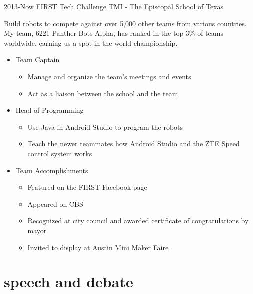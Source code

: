 \documentclass[]{friggeri-cv} %
\begin{document}
\begin{entrylist}
\entry
{2013-Now}
{FIRST Tech Challenge}
{TMI - The Episcopal School of Texas}
{Build robots to compete against over 5,000 other teams from various countries. My team, 6221 Panther Bots Alpha, has ranked in the top 3\% of teams worldwide, earning us a spot in the world championship. 
\begin{itemize}
\item Team Captain 
\begin{itemize}
\item Manage and organize the team's meetings and events 
\item Act as a liaison between the school and the team 
\end{itemize}
\item Head of Programming 
\begin{itemize}
\item Use Java in Android Studio to program the robots 
\item Teach the newer teammates how Android Studio and the ZTE Speed control system works 
\end{itemize}
\end{itemize}
\begin{itemize}
\item Team Accomplishments 
\begin{itemize}
\item Featured on the FIRST Facebook page 
\item Appeared on CBS 
\item Recognized at city council and awarded certificate of congratulations by mayor 
\item Invited to display at Austin Mini Maker Faire 
\end{itemize}
\end{itemize}
}


\end{entrylist}


\section{speech and debate}
\end{document}
